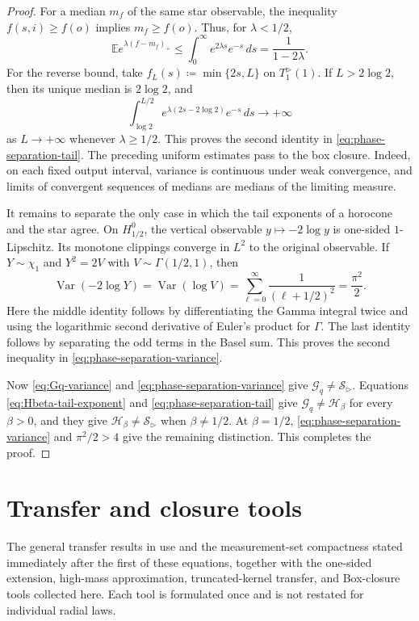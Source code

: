 \documentclass[10pt,a4paper]{amsart}
\numberwithin{equation}{section}
\newcommand{\Var}{\operatorname{Var}}
\begin{document}
\begin{proof}
For a median $m_f$ of the same star observable, the inequality
$f(s,i)\ge f(o)$ implies $m_f\ge f(o)$.  Thus, for $\lambda<1/2$,
\[ \mathbb E e^{\lambda(f-m_f)_+} \le\int_0^\infty e^{2\lambda s}e^{-s}\,ds =\frac1{1-2\lambda}. \]
For the reverse bound, take $f_L(s)\coloneqq\min\{2s,L\}$ on
$T_1^{\rhd}(1)$.  If $L>2\log2$, then its unique median is $2\log2$, and
\[ \int_{\log2}^{L/2} e^{\lambda(2s-2\log2)}e^{-s}\,ds \longrightarrow+\infty \]
as $L\to+\infty$ whenever $\lambda\ge1/2$.  This proves the second identity
in \eqref{eq:phase-separation-tail}.  The preceding uniform estimates pass
to the box closure.  Indeed, on each fixed output interval, variance is
continuous under weak convergence, and limits of convergent sequences of
medians are medians of the limiting measure.

It remains to separate the only case in which the tail exponents of a
horocone and the star agree.  On $H_{1/2}^0$, the vertical observable
$y\mapsto-2\log y$ is one-sided $1$-Lipschitz.  Its monotone clippings
converge in $L^2$ to the original observable.  If $Y\sim\chi_1$ and
$Y^2=2V$ with $V\sim\Gamma(1/2,1)$, then
\[ \Var(-2\log Y)=\Var(\log V) =\sum_{\ell=0}^\infty\frac1{(\ell+1/2)^2} =\frac{\pi^2}{2}. \]
Here the middle identity follows by differentiating the Gamma integral
twice and using the logarithmic second derivative of Euler's product for
$\Gamma$.  The last identity follows by separating the odd terms in the
Basel sum.
This proves the second inequality in \eqref{eq:phase-separation-variance}.

Now \eqref{eq:Gq-variance} and \eqref{eq:phase-separation-variance} give
$\mathcal G_q\ne\mathcal S_{\rhd}$.  Equations
\eqref{eq:Hbeta-tail-exponent} and \eqref{eq:phase-separation-tail} give
$\mathcal G_q\ne\mathcal H_\beta$ for every $\beta>0$, and they give
$\mathcal H_\beta\ne\mathcal S_{\rhd}$ when $\beta\ne1/2$.  At
$\beta=1/2$, \eqref{eq:phase-separation-variance} and $\pi^2/2>4$ give the
remaining distinction.  This completes the proof.
\end{proof}

\appendix

\section{Transfer and closure tools}\label{app:transfer-tools}

The general transfer results in  use
 and the
measurement-set compactness stated immediately after the first of these equations, together with the one-sided extension,
high-mass approximation, truncated-kernel transfer, and Box-closure tools collected here.  Each tool is formulated once and
is not restated for individual radial laws.
\end{document}
